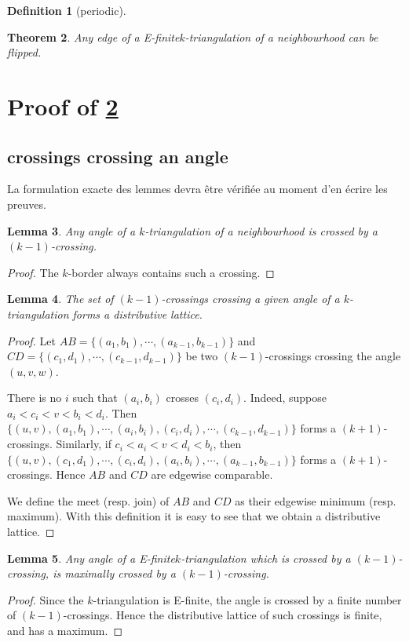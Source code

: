 \documentclass{amsart}
\newtheorem{theorem}{Theorem}[section]
\newtheorem{lemma}[theorem]{Lemma}
\newtheorem{definition}[theorem]{Definition}
\theoremstyle{remark}
\newcommand*{\nbd}[0]{neighbourhood\xspace}
\newcommand*{\ef}[0]{E-finite\xspace}
\newcommand*{\ktg}[0]{$k$-triangulation\xspace}
\begin{document}
\begin{definition}[periodic]

\end{definition}


\begin{theorem}\label{thm:flip}
Any edge of a \ef \ktg of a \nbd can be flipped.
\end{theorem}

\section{Proof of \cref{thm:flip}}

\subsection{crossings crossing an angle}

La formulation exacte des lemmes devra être vérifiée au moment d'en écrire les preuves.

\begin{lemma}
Any angle of a \ktg of a \nbd is crossed by a $(k-1)$-crossing.
\end{lemma}
\begin{proof}
The $k$-border always contains such a crossing.
\end{proof}


\begin{lemma}
The set of $(k-1)$-crossings crossing a given angle of a \ktg forms a distributive lattice.
\end{lemma}
\begin{proof}
Let $AB=\{(a_1,b_1),\cdots,(a_{k-1},b_{k-1})\}$ and $CD=\{(c_1,d_1),\cdots,(c_{k-1},d_{k-1})\}$ be two $(k-1)$-crossings crossing the angle $(u,v,w)$.

There is no $i$ such that $(a_i,b_i)$ crosses $(c_i,d_i)$. 
Indeed, suppose $a_i<c_i<v<b_i<d_i$. Then $\{(u,v),(a_1,b_1),\cdots,(a_i,b_i),(c_i,d_i),\cdots,(c_{k-1},d_{k-1})\}$ forms a $(k+1)$-crossings. 
Similarly, if $c_i<a_i<v<d_i<b_i$, then $\{(u,v),(c_1,d_1),\cdots,(c_i,d_i),(a_i,b_i),\cdots,(a_{k-1},b_{k-1})\}$ forms a $(k+1)$-crossings.
Hence $AB$ and $CD$ are edgewise comparable.

We define the meet (resp. join) of $AB$ and $CD$ as their edgewise minimum (resp. maximum). With this definition it is easy to see that we obtain a distributive lattice.
\end{proof}

\begin{lemma}
Any angle of a \ef \ktg which is crossed by a $(k-1)$-crossing, is maximally crossed by a $(k-1)$-crossing.
\end{lemma}
\begin{proof}
Since the \ktg is \ef, the angle is crossed by a finite number of $(k-1)$-crossings. Hence the distributive lattice of such crossings is finite, and has a maximum.
\end{proof}
\end{document}
